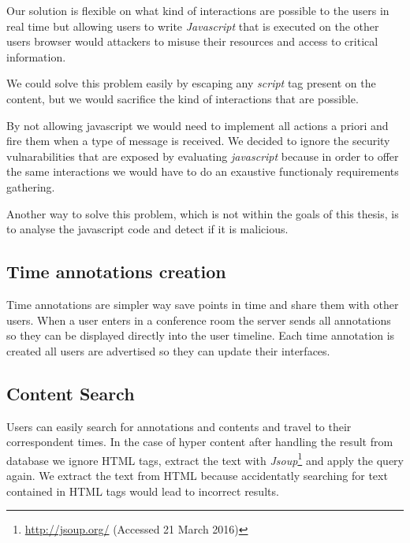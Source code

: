 	Our solution is flexible on what kind of interactions are possible to the users in real time but allowing users to write \emph{Javascript} that is executed on the other users browser would attackers to misuse their resources and access to critical information.

	We could solve this problem easily by escaping any \emph{script} tag present on the content, but we would sacrifice the kind of interactions that are possible. 

	By not allowing javascript we would need to implement all actions a priori and fire them when a type of message is received. We decided to ignore the security vulnarabilities that are exposed by evaluating \emph{javascript} because in order to offer the same interactions we would have to do an exaustive functionaly requirements gathering.

	Another way to solve this problem, which is not within the goals of this thesis, is to analyse the javascript code and detect if it is malicious.


	\subsection{Time annotations creation}

	Time annotations are simpler way save points in time and share them with other users. When a user enters in a conference room the server sends all annotations so they can be displayed directly into the user timeline. Each time annotation is created all users are advertised so they can update their interfaces.

	\subsection{Content Search}

	Users can easily search for annotations and contents and travel to their correspondent times. In the case of hyper content after handling the result from database we ignore \ac{HTML} tags, extract the text with \emph{Jsoup}\footnote{\url{http://jsoup.org/} (Accessed 21 March 2016)} and apply the query again. We extract the text from \ac{HTML} because accidentatly searching for text contained in \ac{HTML} tags would lead to incorrect results.